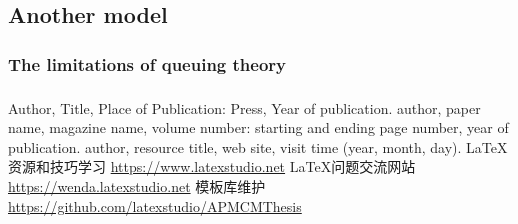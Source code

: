 \documentclass{apmcmthesis}
\begin{document}
\subsection{Another model}
\subsubsection{The limitations of queuing theory}




\subsubsection{}


\subsubsection{}



\subsubsection{}





\begin{thebibliography}{9}%
 Author, Title, Place of Publication: Press, Year of publication.
 author, paper name, magazine name, volume number: starting and ending
page number, year of publication.
 author, resource title, web site, visit time (year, month, day).
 \LaTeX{}{资源和技巧学习} \url{https://www.latexstudio.net}
 \LaTeX{}{问题交流网站} \url{https://wenda.latexstudio.net}
 {模板库维护} \url{https://github.com/latexstudio/APMCMThesis}
\end{thebibliography}

\newpage
\end{document}
